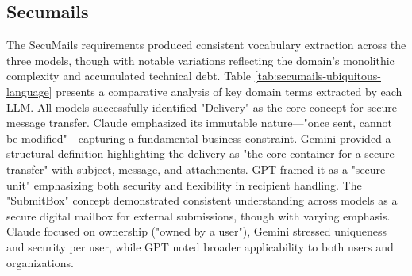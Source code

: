 \subsection{Secumails}

The SecuMails requirements produced consistent vocabulary extraction across the three models, though with notable variations reflecting the domain's monolithic complexity and accumulated technical debt. Table \ref{tab:secumails-ubiquitous-language} presents a comparative analysis of key domain terms extracted by each LLM. All models successfully identified "Delivery" as the core concept for secure message transfer. Claude emphasized its immutable nature—"once sent, cannot be modified"—capturing a fundamental business constraint. Gemini provided a structural definition highlighting the delivery as "the core container for a secure transfer" with subject, message, and attachments. GPT framed it as a "secure unit" emphasizing both security and flexibility in recipient handling. The "SubmitBox" concept demonstrated consistent understanding across models as a secure digital mailbox for external submissions, though with varying emphasis. Claude focused on ownership ("owned by a user"), Gemini stressed uniqueness and security per user, while GPT noted broader applicability to both users and organizations.

